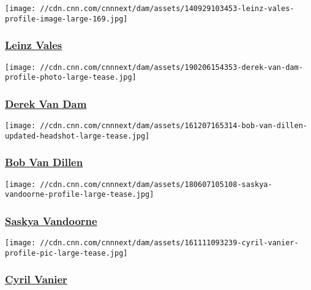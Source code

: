\href{/profiles/leinz-vales}{}

\texttt{[image: //cdn.cnn.com/cnnnext/dam/assets/140929103453-leinz-vales-profile-image-large-169.jpg]}

\hypertarget{leinz-vales}{%
\subsubsection{\texorpdfstring{\href{/profiles/leinz-vales}{Leinz
Vales}}{Leinz Vales}}\label{leinz-vales}}

\href{/profiles/derek-vandam}{}

\texttt{[image: //cdn.cnn.com/cnnnext/dam/assets/190206154353-derek-van-dam-profile-photo-large-tease.jpg]}

\hypertarget{derek-van-dam}{%
\subsubsection{\texorpdfstring{\href{/profiles/derek-vandam}{Derek Van
Dam}}{Derek Van Dam}}\label{derek-van-dam}}

\href{/profiles/bob-van-dillen}{}

\texttt{[image: //cdn.cnn.com/cnnnext/dam/assets/161207165314-bob-van-dillen-updated-headshot-large-tease.jpg]}

\hypertarget{bob-van-dillen}{%
\subsubsection{\texorpdfstring{\href{/profiles/bob-van-dillen}{Bob Van
Dillen}}{Bob Van Dillen}}\label{bob-van-dillen}}

\href{/profiles/saskya-vandoorne-profile}{}

\texttt{[image: //cdn.cnn.com/cnnnext/dam/assets/180607105108-saskya-vandoorne-profile-large-tease.jpg]}

\hypertarget{saskya-vandoorne}{%
\subsubsection{\texorpdfstring{\href{/profiles/saskya-vandoorne-profile}{Saskya
Vandoorne}}{Saskya Vandoorne}}\label{saskya-vandoorne}}

\href{/profiles/cyril-vanier-profile}{}

\texttt{[image: //cdn.cnn.com/cnnnext/dam/assets/161111093239-cyril-vanier-profile-pic-large-tease.jpg]}

\hypertarget{cyril-vanier}{%
\subsubsection{\texorpdfstring{\href{/profiles/cyril-vanier-profile}{Cyril
Vanier}}{Cyril Vanier}}\label{cyril-vanier}}

